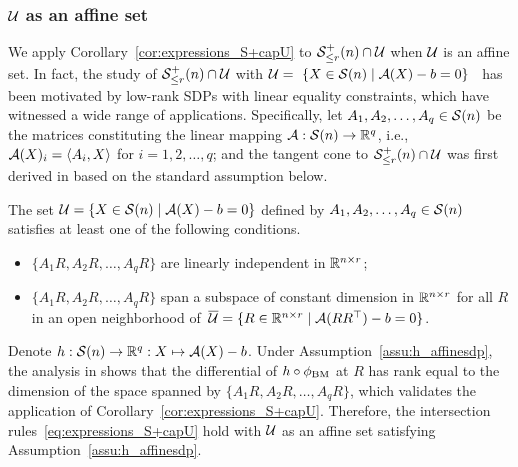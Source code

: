 \subsubsection{$\mathcal{U}$ as an affine set}
We apply Corollary~\ref{cor:expressions_S+capU} to $\mathcal{S}^+_{\le r}(n)\cap\mathcal{U}$ when $\mathcal{U}$ is an affine set. In fact, the study of $\mathcal{S}^+_{\le r}(n)\cap\mathcal{U}$ with $\mathcal{U}=\
\{X\in\mathcal{S}(n)\mid\mathcal{A}(X)-b=0\}$~\cite{boumal2020deterministic,levin2025effect} has been motivated by low-rank SDPs with linear equality constraints, which have witnessed a wide range of applications. Specifically, let $A_1,A_2,\ldots,A_q\in\mathcal{S}(n)$ be the matrices constituting the linear mapping $\mathcal{A}:\mathcal{S}(n)\to\mathbb{R}^q$, i.e., $\mathcal{A}(X)_i=\langle {A_i,X} \rangle$ for $i=1,2,\ldots,q$; and the tangent cone to $\mathcal{S}^+_{\le r}(n)\cap\mathcal{U}$ was first derived in \cite{levin2025effect} based on the standard assumption below.

\begin{assumption}{\cite[Assumption~1.1]{boumal2020deterministic}}\label{assu:h_affinesdp} 
    The set $\mathcal{U}=\{X\in\mathcal{S}(n)\mid\mathcal{A}(X)-b=0\}$ defined by $A_1,A_2,\ldots,A_q\in\mathcal{S}(n)$ satisfies at least one of the following conditions.
    \begin{itemize}
        \item [\emph{(i)}] $\{A_1R,A_2R,\ldots,A_qR\}$ are linearly independent in $\mathbb{R}^{n\times r}$;
        \item [\emph{(ii)}] $\{A_1R,A_2R,\ldots,A_qR\}$ span a subspace of constant dimension in $\mathbb{R}^{n\times r}$ for all $R$ in an open neighborhood of\ $\overline{\mathcal{U}}=\{R\in\mathbb{R}^{n\times r}\mid\mathcal{A}(RR^\top)-b=0\}$.
    \end{itemize}
\end{assumption}

Denote $h:\mathcal{S}(n)\to\mathbb{R}^q: X\mapsto\mathcal{A}(X)-b$. Under Assumption~\ref{assu:h_affinesdp}, the analysis in \cite[Appendix A]{boumal2020deterministic} shows that the differential of $h\circ\phi_{\mathrm{BM}}$ at $R$ has rank equal to the dimension of the space spanned by $\{A_1R,A_2R,\ldots,A_qR\}$, which validates the application of Corollary~\ref{cor:expressions_S+capU}. Therefore, the intersection rules~\eqref{eq:expressions_S+capU} hold with $\mathcal{U}$ as an affine set satisfying Assumption~\ref{assu:h_affinesdp}.


